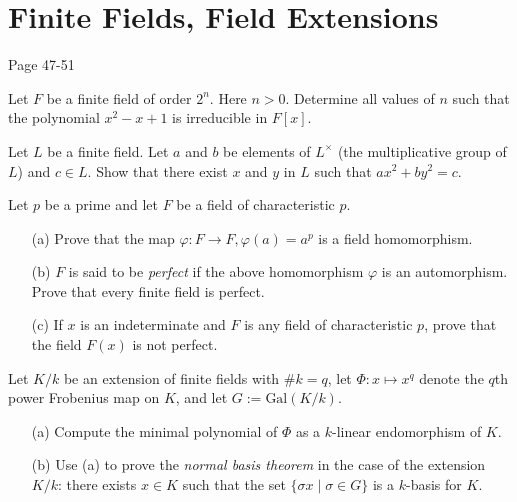 \chapter{Finite Fields, Field Extensions}
Page 47-51

\begin{prob}[F2016-Q3]
    Let \(F\) be a finite field of order \(2^{n}\). Here \(n>0\). Determine all values of \(n\) such that the polynomial \(x^{2}-x+1\) is irreducible in \(F[x]\).
\end{prob}


\begin{prob}[F2015-Q5]
    Let \(L\) be a finite field. Let \(a\) and \(b\) be elements of \(L^\times\) (the multiplicative group of \(L\)) and \(c \in L\). Show that there exist \(x\) and \(y\) in \(L\) such that \(ax^2 + by^2 = c\).
\end{prob}

\begin{prob}[F2013-Q6]
    Let \(p\) be a prime and let \(F\) be a field of characteristic \(p\).
    \begin{itemize}
        \item[(a)] Prove that the map \(\varphi : F \to F, \varphi(a) = a^p\) is a field homomorphism.
        \item[(b)] \(F\) is said to be \textit{perfect} if the above homomorphism \(\varphi\) is an automorphism. Prove that every finite field is perfect.
        \item[(c)] If \(x\) is an indeterminate and \(F\) is any field of characteristic \(p\), prove that the field \(F(x)\) is not perfect.
    \end{itemize}
\end{prob}

\begin{prob}[F2017-Q5]
    Let \(K/k\) be an extension of finite fields with \(\#k=q\), let \(\Phi\colon x\mapsto x^{q}\) denote the \(q\)th power Frobenius map on \(K\), and let \(G:=\text{Gal}(K/k)\).
    \begin{itemize}
        \item[(a)] Compute the minimal polynomial of \(\Phi\) as a \(k\)-linear endomorphism of \(K\).
        \item[(b)] Use (a) to prove the \textit{normal basis theorem} in the case of the extension \(K/k\): there exists \(x\in K\) such that the set \(\{\sigma x\mid\sigma\in G\}\) is a \(k\)-basis for \(K\).
    \end{itemize}
\end{prob}

